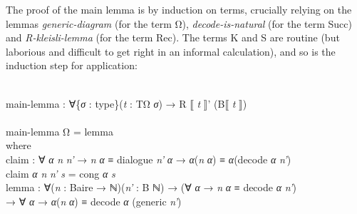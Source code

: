 \documentclass{entcs} \usepackage{prentcsmacro}
\newcommand{\AgdaC}[1]{\mbox{#1}}
\newcommand{\AgdaFontStyle}[1]{\textsf{#1}}
\newcommand{\AgdaBoundFontStyle}[1]{\textit{#1}}
\newcommand{\AgdaKeyword}     [1]
    {\AgdaFontStyle{\textcolor{AgdaKeyword}{#1}}}
\newcommand{\AgdaSymbol}      [1]{\textcolor{AgdaSymbol}{#1}}
\newcommand{\AgdaBound}    [1]{\AgdaBoundFontStyle{\textcolor{AgdaBound}{#1}}}
\newcommand{\AgdaInductiveConstructor}[1]
    {\AgdaFontStyle{\textcolor{AgdaInductiveConstructor}{#1}}}
\newcommand{\AgdaDatatype} [1]{\AgdaFontStyle{\textcolor{AgdaDatatype}{#1}}}
\newcommand{\AgdaFunction} [1]{\AgdaFontStyle{\textcolor{AgdaFunction}{#1}}}
\newcommand{\AgdaIndent}[1]{\quad}
\newcommand{\AgdaCodeStyle}{\small}
\newenvironment{code}%
{\noindent\AgdaCodeStyle\pboxed}%
{\endpboxed\par\noindent%
\ignorespacesafterend}
\begin{document}
The proof of the main lemma is by induction on terms, crucially
relying on the lemmas \emph{generic-diagram} (for the term
\AgdaC{Ω}), \emph{decode-is-natural} (for the term \AgdaC{Succ}) and
\emph{R-kleisli-lemma} (for the term \AgdaC{Rec}). The terms \AgdaC{K}
and \AgdaC{S} are routine (but laborious and difficult to get right in
an informal calculation), and so is the induction step for
application:

\begin{code}\>\<%
\\
\>\AgdaFunction{main-lemma} \AgdaSymbol{:} \AgdaSymbol{∀\{}\AgdaBound{σ} \AgdaSymbol{:} \AgdaDatatype{type}\AgdaSymbol{\}(}\AgdaBound{t} \AgdaSymbol{:} \AgdaDatatype{TΩ} \AgdaBound{σ}\AgdaSymbol{)} \AgdaSymbol{→} \AgdaFunction{R} \AgdaFunction{⟦} \AgdaBound{t} \AgdaFunction{⟧'} \AgdaSymbol{(}\AgdaFunction{B⟦} \AgdaBound{t} \AgdaFunction{⟧}\AgdaSymbol{)}\<%
\\
%
\\
\>\AgdaFunction{main-lemma} \AgdaInductiveConstructor{Ω} \AgdaSymbol{=} \AgdaFunction{lemma}\<%
\\
\>[0]\AgdaIndent{2}{}\<[2]%
\>[2]\AgdaKeyword{where} \<[8]%
\>[8]\<%
\\
\>[2]\AgdaIndent{4}{}\<[4]%
\>[4]\AgdaFunction{claim} \AgdaSymbol{:} \AgdaSymbol{∀} \AgdaBound{α} \AgdaBound{n} \AgdaBound{n'} \AgdaSymbol{→} \AgdaBound{n} \AgdaBound{α} \AgdaDatatype{≡} \AgdaFunction{dialogue} \AgdaBound{n'} \AgdaBound{α} \AgdaSymbol{→} \AgdaBound{α}\AgdaSymbol{(}\AgdaBound{n} \AgdaBound{α}\AgdaSymbol{)} \AgdaDatatype{≡} \AgdaBound{α}\AgdaSymbol{(}\AgdaFunction{decode} \AgdaBound{α} \AgdaBound{n'}\AgdaSymbol{)}\<%
\\
\>[2]\AgdaIndent{4}{}\<[4]%
\>[4]\AgdaFunction{claim} \AgdaBound{α} \AgdaBound{n} \AgdaBound{n'} \AgdaBound{s} \AgdaSymbol{=} \AgdaFunction{cong} \AgdaBound{α} \AgdaBound{s} \<[30]%
\>[30]\<%
\\
\>[2]\AgdaIndent{4}{}\<[4]%
\>[4]\AgdaFunction{lemma} \AgdaSymbol{:} \AgdaSymbol{∀(}\AgdaBound{n} \AgdaSymbol{:} \AgdaFunction{Baire} \AgdaSymbol{→} \AgdaDatatype{ℕ}\AgdaSymbol{)(}\AgdaBound{n'} \AgdaSymbol{:} \AgdaFunction{B} \AgdaDatatype{ℕ}\AgdaSymbol{)} \AgdaSymbol{→} \AgdaSymbol{(∀} \AgdaBound{α} \AgdaSymbol{→} \AgdaBound{n} \AgdaBound{α} \AgdaDatatype{≡} \AgdaFunction{decode} \AgdaBound{α} \AgdaBound{n'}\AgdaSymbol{)} \<[67]%
\>[67]\<%
\\
\>[4]\AgdaIndent{10}{}\<[10]%
\>[10]\AgdaSymbol{→} \AgdaSymbol{∀} \AgdaBound{α} \AgdaSymbol{→} \AgdaBound{α}\AgdaSymbol{(}\AgdaBound{n} \AgdaBound{α}\AgdaSymbol{)} \AgdaDatatype{≡} \AgdaFunction{decode} \AgdaBound{α} \AgdaSymbol{(}\AgdaFunction{generic} \AgdaBound{n'}\AgdaSymbol{)}\<%

\end{code}
\end{document}

